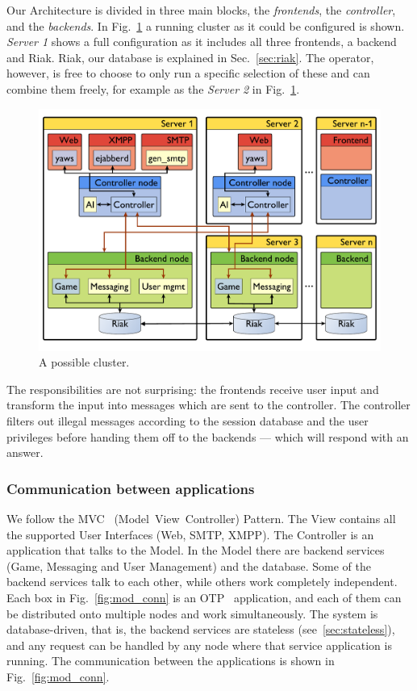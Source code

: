 \documentclass[11pt,a4paper]{report}
\begin{document}
Our Architecture is divided in three main blocks, the {\em frontends}, the
{\em controller}, and the {\em backends}. In Fig.~\ref{fig:arch} a running
cluster as it could be configured is shown. {\em Server 1} shows a full
configuration as it includes all three frontends, a backend and Riak. Riak, our
database is explained in Sec.~\ref{sec:riak}.
The operator, however, is free to choose to only run a specific selection of
these and can combine them freely, for example as the {\em Server 2} in
Fig.~\ref{fig:arch}.

\begin{figure}[h]
 \centering
 \includegraphics[width=\textwidth]{./graphics/arch.pdf}
 \caption{A possible cluster.}
 \label{fig:arch}
\end{figure}

The responsibilities are not surprising: the frontends receive user input and
transform the input into messages which are sent to the controller.
The controller filters out illegal messages according to the session database
and the user privileges before handing them off to the backends --- which will
respond with an answer.

\subsubsection{Communication between applications}\label{mvc}
We follow the MVC~\cite{mvc} (Model~View~Controller) Pattern.
The View contains all the supported User Interfaces (Web, SMTP, XMPP). The
Controller is an application that talks to the Model. In the Model there
are backend services (Game, Messaging and User Management) and the database.
Some of the backend services talk to each other, while others work completely
independent. Each box in Fig.~\ref{fig:mod_conn} is an OTP~\cite{erlang_otp}
application, and each of them can be distributed onto multiple nodes and work
simultaneously. The system is database-driven, that is, the backend services are
stateless (see~\ref{sec:stateless}), and any request can be handled
by any node where that service application is running. The communication between
the applications is shown in Fig.~\ref{fig:mod_conn}.
\end{document}
